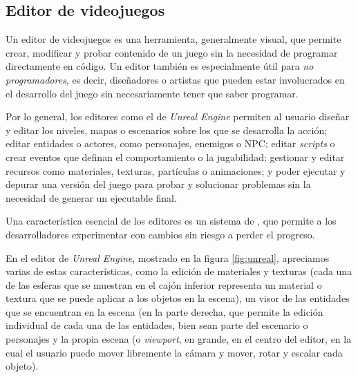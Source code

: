 \subsection{Editor de videojuegos} \label{sec:editorvj}

Un editor de videojuegos es una herramienta, generalmente visual, que permite crear, modificar y probar contenido de un juego sin la necesidad de programar directamente en código. Un editor también es especialmente útil para \textit{no programadores}, es decir, diseñadores o artistas que pueden estar involucrados en el desarrollo del juego sin necesariamente tener que saber programar.

\medskip

Por lo general, los editores como el de \textit{Unreal Engine} permiten al usuario diseñar y editar los niveles, mapas o escenarios sobre los que se desarrolla la acción; editar entidades o actores, como personajes, enemigos o NPC; editar \textit{scripts} o crear eventos que definan el comportamiento o la jugabilidad; gestionar y editar recursos como materiales, texturas, partículas o animaciones; y poder ejecutar y depurar una versión del juego para probar y solucionar problemas sin la necesidad de generar un ejecutable final.

\smallskip


Una característica esencial de los editores es un sistema de , que permite a los desarrolladores experimentar con cambios sin riesgo a perder el progreso.

\medskip

En el editor de \textit{Unreal Engine}, mostrado en la figura \ref{fig:unreal}, apreciamos varias de estas características, como la edición de materiales y texturas (cada una de las esferas que se muestran en el cajón inferior representa un material o textura que se puede aplicar a los objetos en la escena), un visor de las entidades que se encuentran en la escena (en la parte derecha, que permite la edición individual de cada una de las entidades, bien sean parte del escenario o personajes y la propia escena (o \textit{viewport}, en grande, en el centro del editor, en la cual el usuario puede mover libremente la cámara y mover, rotar y escalar cada objeto).

